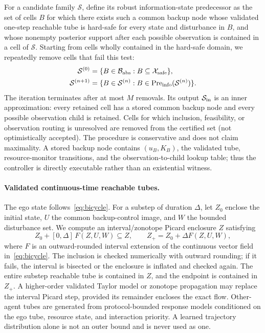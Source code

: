 \documentclass[letterpaper]{article} %
\begin{document}
For a candidate family $\mathcal S$, define its robust information-state
predecessor as the set of cells $B$ for which there exists such a common
backup node whose validated one-step reachable tube is hard-safe for every
state and disturbance in $B$, and whose nonempty posterior support after
each possible observation is contained in a cell of $\mathcal S$. Starting
from cells wholly contained in the hard-safe domain, we repeatedly remove
cells that fail this test:
\begin{equation}
\begin{aligned}
\mathcal S^{(0)}&=\{B\in\mathcal B_{\rm abs}:B\subseteq\mathcal X_{\rm safe}\},\\
\mathcal S^{(n+1)}&=\{B\in\mathcal S^{(n)}:
B\in\operatorname{Pre}_{\rm info}(\mathcal S^{(n)})\}.
\end{aligned}
\label{eq:info-invariant-iteration}
\end{equation}
The iteration terminates after at most $M$ removals. Its output
$\mathcal S_{\rm in}$ is an inner approximation: every retained cell has a
stored common backup node and every possible observation child is retained.
Cells for which inclusion, feasibility, or observation routing is unresolved
are removed from the certified set (not optimistically accepted). The
procedure is conservative and does not claim maximality. A stored backup
node contains $(u_B,K_B)$, the validated tube, resource-monitor transitions,
and the observation-to-child lookup table; thus the controller is directly
executable rather than an existential witness.

\paragraph{Validated continuous-time reachable tubes.}
The ego state follows~\eqref{eq:bicycle}. For a substep of duration $\Delta$,
let $Z_0$ enclose the initial state, $U$ the common backup-control image,
and $W$ the bounded disturbance set. We compute an interval/zonotope
Picard enclosure $Z$ satisfying
\begin{equation}
Z_0+[0,\Delta]\,F(Z,U,W)\subseteq Z,
\qquad
Z_{+}=Z_0+\Delta F(Z,U,W),
\label{eq:picard-tube}
\end{equation}
where $F$ is an outward-rounded interval extension of the continuous vector
field in~\eqref{eq:bicycle}. The inclusion is checked numerically with
outward rounding; if it fails, the interval is bisected or the enclosure is
inflated and checked again. The entire substep reachable tube is contained in
$Z$, and the endpoint is contained in $Z_{+}$. A higher-order validated Taylor
model or zonotope propagation may replace the interval Picard step, provided
its remainder encloses the exact flow. Other-agent tubes are generated from
protocol-bounded response models conditioned on the ego tube, resource state,
and interaction priority. A learned trajectory distribution alone is not an
outer bound and is never used as one.
\end{document}
